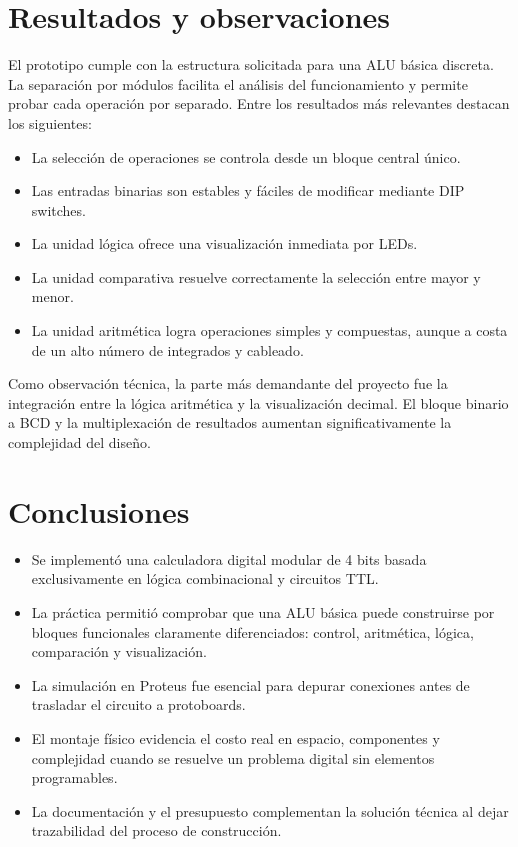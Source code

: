 \documentclass[12pt,a4paper]{article}
\begin{document}
\section{Resultados y observaciones}
El prototipo cumple con la estructura solicitada para una ALU básica discreta. La separación por módulos facilita el análisis del funcionamiento y permite probar cada operación por separado. Entre los resultados más relevantes destacan los siguientes:
\begin{itemize}[leftmargin=1.2cm]
    \item La selección de operaciones se controla desde un bloque central único.
    \item Las entradas binarias son estables y fáciles de modificar mediante DIP switches.
    \item La unidad lógica ofrece una visualización inmediata por LEDs.
    \item La unidad comparativa resuelve correctamente la selección entre mayor y menor.
    \item La unidad aritmética logra operaciones simples y compuestas, aunque a costa de un alto número de integrados y cableado.
\end{itemize}

Como observación técnica, la parte más demandante del proyecto fue la integración entre la lógica aritmética y la visualización decimal. El bloque binario a BCD y la multiplexación de resultados aumentan significativamente la complejidad del diseño.

\section{Conclusiones}
\begin{itemize}[leftmargin=1.2cm]
    \item Se implementó una calculadora digital modular de 4 bits basada exclusivamente en lógica combinacional y circuitos TTL.
    \item La práctica permitió comprobar que una ALU básica puede construirse por bloques funcionales claramente diferenciados: control, aritmética, lógica, comparación y visualización.
    \item La simulación en Proteus fue esencial para depurar conexiones antes de trasladar el circuito a protoboards.
    \item El montaje físico evidencia el costo real en espacio, componentes y complejidad cuando se resuelve un problema digital sin elementos programables.
    \item La documentación y el presupuesto complementan la solución técnica al dejar trazabilidad del proceso de construcción.
\end{itemize}
\end{document}
